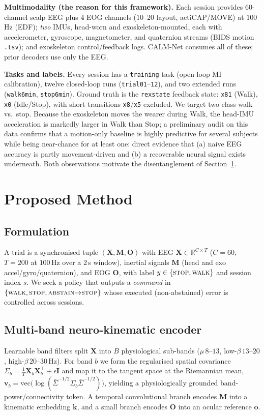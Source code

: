\documentclass[conference]{IEEEtran}
\begin{document}
\textbf{Multimodality (the reason for this framework).} Each session provides
$60$-channel scalp EEG plus $4$ EOG channels ($10$--$20$ layout, actiCAP/MOVE) at
$100$\,Hz (EDF); \emph{two} IMUs, head-worn and exoskeleton-mounted, each with
accelerometer, gyroscope, magnetometer, and quaternion streams (BIDS motion
\texttt{.tsv}); and exoskeleton control/feedback logs. CALM-Net consumes all of
these; prior decoders use only the EEG.

\textbf{Tasks and labels.} Every session has a \texttt{training} task (open-loop MI
calibration), twelve closed-loop runs (\texttt{trial01}--\texttt{12}), and two
extended runs (\texttt{walk6min}, \texttt{stop6min}). Ground truth is the
\texttt{rexstate} feedback state: \texttt{x81} (Walk), \texttt{x0} (Idle/Stop), with
short transitions \texttt{x8}/\texttt{x5} excluded. We target two-class walk vs.\
stop. Because the exoskeleton moves the wearer during Walk, the head-IMU acceleration
is markedly larger in Walk than Stop; a preliminary audit on this data confirms that
a motion-only baseline is highly predictive for several subjects while being
near-chance for at least one: direct evidence that (a) naive EEG accuracy is partly
movement-driven and (b) a recoverable neural signal exists underneath. Both
observations motivate the disentanglement of Section~\ref{sec:method}.

\section{Proposed Method}\label{sec:method}
\subsection{Formulation}
A trial is a synchronised tuple $(\mathbf{X},\mathbf{M},\mathbf{O})$ with EEG
$\mathbf{X}\in\mathbb{R}^{C\times T}$ ($C{=}60$, $T{=}200$ at $100$\,Hz over a $2$\,s
window), inertial signals $\mathbf{M}$ (head and exo accel/gyro/quaternion), and EOG
$\mathbf{O}$, with label $y\in\{\textsc{stop},\textsc{walk}\}$ and session index
$s$. We seek a policy that outputs a \emph{command} in
$\{\textsc{walk},\textsc{stop},\textsc{abstain}{\to}\textsc{stop}\}$ whose executed
(non-abstained) error is controlled across sessions.

\subsection{Multi-band neuro-kinematic encoder}
Learnable band filters split $\mathbf{X}$ into $B$ physiological sub-bands
($\mu\,8$--$13$, low-$\beta\,13$--$20$, high-$\beta\,20$--$30$\,Hz). For band $b$ we
form the regularised spatial covariance
$\Sigma_b = \tfrac{1}{T}\mathbf{X}_b\mathbf{X}_b^{\!\top} + \epsilon\mathbf{I}$ and map
it to the tangent space at the Riemannian mean,
$\mathbf{v}_b=\mathrm{vec}\!\big(\log(\bar\Sigma^{-1/2}\Sigma_b\bar\Sigma^{-1/2})\big)$,
yielding a physiologically grounded band-power/connectivity token. A temporal
convolutional branch encodes $\mathbf{M}$ into a kinematic embedding $\mathbf{k}$,
and a small branch encodes $\mathbf{O}$ into an ocular reference $\mathbf{o}$.
\end{document}
